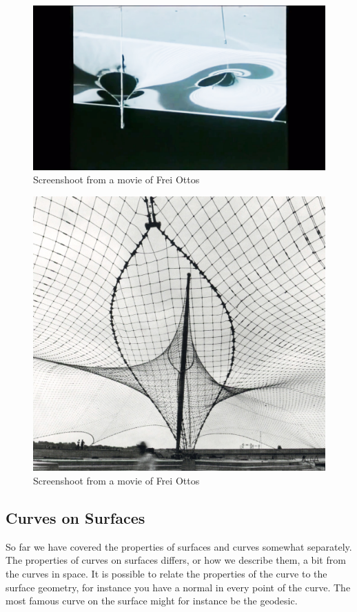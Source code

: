 \begin{figure}[H] 
\centering
\includegraphics[width=0.9\linewidth ]{figure/Theory/SoapSreeen.jpg}
\caption{Screenshoot from a movie of Frei Ottos \cite{ref:FreiOttoSoap}}
\end{figure}


\begin{figure}[H] 
\centering
\includegraphics[width=0.9\linewidth ]{figure/Theory/FreiOtto.jpg}
\caption{Screenshoot from a movie of Frei Ottos}
\end{figure}



\subsection{Curves on Surfaces}

So far we have covered the properties of surfaces and curves somewhat separately. The properties of curves on surfaces differs, or how we describe them, a bit from the curves in  space. It is possible to relate the properties of the curve to the surface geometry, for instance you have a normal in every point of the curve. The most famous curve on the surface might for instance be the geodesic.

